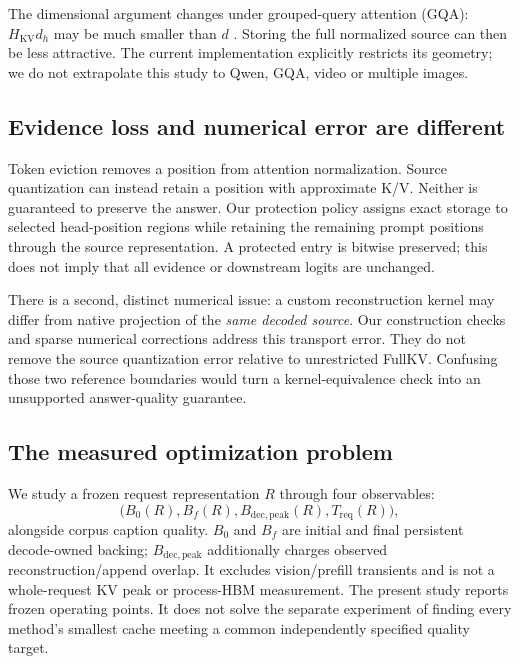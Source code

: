 The dimensional argument changes under grouped-query attention (GQA):
$H_{\mathrm{KV}}d_h$ may be much smaller than $d$
\citep{ainslie2023gqa}. Storing the full normalized source can then be less
attractive. The current implementation explicitly restricts its geometry;
we do not extrapolate this study to Qwen, GQA, video or multiple images.

\subsection{Evidence loss and numerical error are different}
Token eviction removes a position from attention normalization. Source
quantization can instead retain a position with approximate K/V. Neither is
guaranteed to preserve the answer. Our protection policy assigns exact
storage to selected head-position regions while retaining the remaining
prompt positions through the source representation. A protected entry is
bitwise preserved; this does not imply that all evidence or downstream
logits are unchanged.

There is a second, distinct numerical issue: a custom reconstruction kernel
may differ from native projection of the \emph{same decoded source}. Our
construction checks and sparse numerical corrections address this transport
error. They do not remove the source quantization error relative to
unrestricted FullKV. Confusing those two reference boundaries would turn a
kernel-equivalence check into an unsupported answer-quality guarantee.

\subsection{The measured optimization problem}
We study a frozen request representation $R$ through four observables:
\begin{equation}
 \big(B_0(R),B_f(R),B_{\mathrm{dec,peak}}(R),T_{\mathrm{req}}(R)\big),
 \label{eq:observables}
\end{equation}
alongside corpus caption quality. $B_0$ and $B_f$ are initial and final
persistent decode-owned backing; $B_{\mathrm{dec,peak}}$ additionally
charges observed reconstruction/append overlap. It excludes vision/prefill
transients and is not a whole-request KV peak or process-HBM measurement.
The present study reports frozen operating points. It does not solve the
separate experiment of finding every method's smallest cache meeting a
common independently specified quality target.
